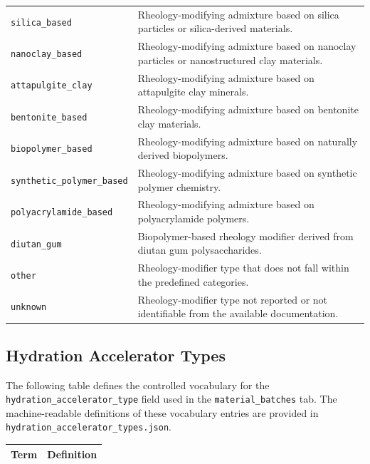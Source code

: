 \documentclass[11pt]{book}
\begin{document}
{\begin{longtable}{p{}p{}}
\texttt{silica\_based} &
Rheology-modifying admixture based on silica particles or silica-derived materials. \\

\texttt{nanoclay\_based} &
Rheology-modifying admixture based on nanoclay particles or nanostructured clay materials. \\

\texttt{attapulgite\_clay} &
Rheology-modifying admixture based on attapulgite clay minerals. \\

\texttt{bentonite\_based} &
Rheology-modifying admixture based on bentonite clay materials. \\

\texttt{biopolymer\_based} &
Rheology-modifying admixture based on naturally derived biopolymers. \\

\texttt{synthetic\_polymer\_based} &
Rheology-modifying admixture based on synthetic polymer chemistry. \\

\texttt{polyacrylamide\_based} &
Rheology-modifying admixture based on polyacrylamide polymers. \\

\texttt{diutan\_gum} &
Biopolymer-based rheology modifier derived from diutan gum polysaccharides. \\

\texttt{other} &
Rheology-modifier type that does not fall within the predefined categories. \\

\texttt{unknown} &
Rheology-modifier type not reported or not identifiable from the available documentation. \\

\hline
\end{longtable}


\subsection{Hydration Accelerator Types}
\label{vocab:hydration_accelerator_type_list}

The following table defines the controlled vocabulary for the \texttt{hydration\_accelerator\_type} field used in the \texttt{material\_batches} tab. The machine-readable definitions of these vocabulary entries are provided in \texttt{hydration\_accelerator\_types.json}.

\begin{longtable}{p{}p{}}
\hline
\textbf{Term} & \textbf{Definition} \\
\hline
\endfirsthead


\end{longtable}}
\end{document}
